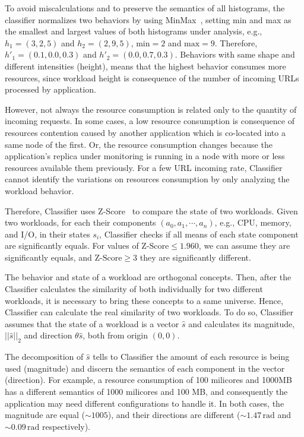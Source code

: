 To avoid miscalculations and to preserve the semantics of all histograms, the
classifier normalizes two behaviors by using MinMax~\cite{?}, setting min and
max as the smallest and largest values of both histograms under analysis, e.g.,
$h_1 = (3, 2, 5)$ and $h_2 = (2, 9, 5)$, $\text{min} = 2$ and $\text{max} = 9$.
Therefore, $h'_1 = (0.1, 0.0, 0.3)$ and $h'_2 = (0.0, 0.7, 0.3)$. Behaviors with
same shape and different intensities (height), means that the highest behavior
consumes more resources, since workload height is consequence of the number of
incoming URLs processed by application.

However, not always the resource consumption is related only to the quantity of
incoming requests. In some cases, a low resource consumption is consequence of
resources contention caused by another application which is co-located into a
same node of the first. Or, the resource consumption changes because the
application's replica under monitoring is running in a node with more or less
resources available them previously. For a few URL incoming rate, Classifier
cannot identify the variations on resources consumption by only analyzing the
workload behavior.

Therefore, Classifier uses Z-Score~\cite{?} to compare the state of two
workloads.  Given two workloads, for each their components $(a_0, a_1, \cdots,
a_n)$, e.g., CPU, memory, and I/O, in their states $s_i$, Classifier checks if
all means of each state component are significantly equals. For values of
$\text{Z-Score} \leq 1.960$, we can assume they are significantly equals, and
$\text{Z-Score} \geq 3$ they are significantly different.

The behavior and state of a workload are orthogonal concepts. Then, after the
Classifier calculates the similarity of both individually for two different
workloads,  it is necessary to bring these concepts to a same universe. Hence,
Classifier can calculate the real similarity of two workloads.  To do so,
Classifier assumes that the state of a workload is a vector $\hat{s}$ and
calculates its magnitude, $||\hat{s}||_2$ and direction $\theta \hat{s}$, both
from origin $(0,0)$.

The decomposition of $\hat{s}$ tells to Classifier the amount of each resource
is being used (magnitude) and discern the semantics of each component in the
vector (direction). For example, a resource consumption of 100 milicores and
1000MB has a different semantics of 1000 milicores and 100 MB, and consequently
the application may need different configurations to handle it. In both cases,
the magnitude are equal ($\sim 1005$), and their directions are different ($\sim
1.47\,\text{rad}$ and $\sim 0.09\,\text{rad}$ respectively).

